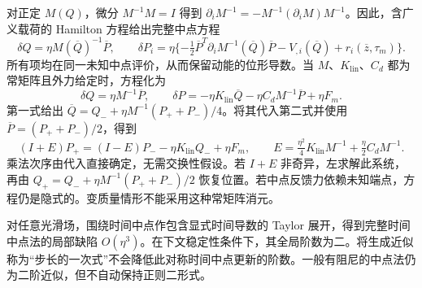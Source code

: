 对正定 $M(Q)$，微分 $M^{-1}M=I$ 得到 $\partial_iM^{-1}=-M^{-1}(\partial_iM)M^{-1}$。因此，含广义载荷的 Hamilton 方程给出完整中点方程
\begin{equation}
 \delta Q=\eta M(\overline Q)^{-1}\overline P,\qquad
 \delta P_i=\eta\{-\tfrac12\overline P^T\partial_iM^{-1}(\overline Q)\overline P
                    -V_{,i}(\overline Q)+r_i(\overline z,\tau_m)\}.
 \label{eq:sup-full-midpoint}
\end{equation}
所有项均在同一未知中点评价，从而保留动能的位形导数。当 $M$、$K_{\mathrm{lin}}$、$C_d$ 都为常矩阵且外力给定时，方程化为
\begin{equation}
 \delta Q=\eta M^{-1}\overline P,\qquad
 \delta P=-\eta K_{\mathrm{lin}}\overline Q-\eta C_dM^{-1}\overline P+\eta F_m.
 \label{eq:sup-constant-midpoint}
\end{equation}
第一式给出 $\overline Q=Q_-+\eta M^{-1}(P_++P_-)/4$。将其代入第二式并使用 $\overline P=(P_++P_-)/2$，得到
\begin{equation}
 (I+E)P_+=(I-E)P_- -\eta K_{\mathrm{lin}}Q_-+\eta F_m,
 \qquad E=\tfrac{\eta^2}{4}K_{\mathrm{lin}}M^{-1}+\tfrac\eta2 C_dM^{-1}.
 \label{eq:sup-leftsolve-proof}
\end{equation}
乘法次序由代入直接确定，无需交换性假设。若 $I+E$ 非奇异，左求解此系统，再由 $Q_+=Q_-+\eta M^{-1}(P_++P_-)/2$ 恢复位置。若中点反馈力依赖未知端点，方程仍是隐式的。变质量情形不能采用这种常矩阵消元。

对任意光滑场，围绕时间中点作包含显式时间导数的 Taylor 展开，得到完整时间中点法的局部缺陷 $O(\eta^3)$。在下文稳定性条件下，其全局阶数为二。将生成近似称为“步长的一次式”不会降低此对称时间中点更新的阶数。一般有阻尼的中点法仍为二阶近似，但不自动保持正则二形式。

